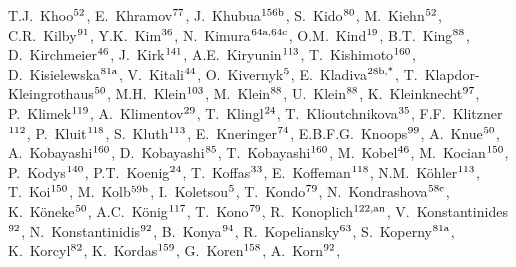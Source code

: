 \begin{flushleft}
T.J.~Khoo$^\textrm{\scriptsize 52}$,    
E.~Khramov$^\textrm{\scriptsize 77}$,    
J.~Khubua$^\textrm{\scriptsize 156b}$,    
S.~Kido$^\textrm{\scriptsize 80}$,    
M.~Kiehn$^\textrm{\scriptsize 52}$,    
C.R.~Kilby$^\textrm{\scriptsize 91}$,    
Y.K.~Kim$^\textrm{\scriptsize 36}$,    
N.~Kimura$^\textrm{\scriptsize 64a,64c}$,    
O.M.~Kind$^\textrm{\scriptsize 19}$,    
B.T.~King$^\textrm{\scriptsize 88}$,    
D.~Kirchmeier$^\textrm{\scriptsize 46}$,    
J.~Kirk$^\textrm{\scriptsize 141}$,    
A.E.~Kiryunin$^\textrm{\scriptsize 113}$,    
T.~Kishimoto$^\textrm{\scriptsize 160}$,    
D.~Kisielewska$^\textrm{\scriptsize 81a}$,    
V.~Kitali$^\textrm{\scriptsize 44}$,    
O.~Kivernyk$^\textrm{\scriptsize 5}$,    
E.~Kladiva$^\textrm{\scriptsize 28b,*}$,    
T.~Klapdor-Kleingrothaus$^\textrm{\scriptsize 50}$,    
M.H.~Klein$^\textrm{\scriptsize 103}$,    
M.~Klein$^\textrm{\scriptsize 88}$,    
U.~Klein$^\textrm{\scriptsize 88}$,    
K.~Kleinknecht$^\textrm{\scriptsize 97}$,    
P.~Klimek$^\textrm{\scriptsize 119}$,    
A.~Klimentov$^\textrm{\scriptsize 29}$,    
T.~Klingl$^\textrm{\scriptsize 24}$,    
T.~Klioutchnikova$^\textrm{\scriptsize 35}$,    
F.F.~Klitzner$^\textrm{\scriptsize 112}$,    
P.~Kluit$^\textrm{\scriptsize 118}$,    
S.~Kluth$^\textrm{\scriptsize 113}$,    
E.~Kneringer$^\textrm{\scriptsize 74}$,    
E.B.F.G.~Knoops$^\textrm{\scriptsize 99}$,    
A.~Knue$^\textrm{\scriptsize 50}$,    
A.~Kobayashi$^\textrm{\scriptsize 160}$,    
D.~Kobayashi$^\textrm{\scriptsize 85}$,    
T.~Kobayashi$^\textrm{\scriptsize 160}$,    
M.~Kobel$^\textrm{\scriptsize 46}$,    
M.~Kocian$^\textrm{\scriptsize 150}$,    
P.~Kodys$^\textrm{\scriptsize 140}$,    
P.T.~Koenig$^\textrm{\scriptsize 24}$,    
T.~Koffas$^\textrm{\scriptsize 33}$,    
E.~Koffeman$^\textrm{\scriptsize 118}$,    
N.M.~K\"ohler$^\textrm{\scriptsize 113}$,    
T.~Koi$^\textrm{\scriptsize 150}$,    
M.~Kolb$^\textrm{\scriptsize 59b}$,    
I.~Koletsou$^\textrm{\scriptsize 5}$,    
T.~Kondo$^\textrm{\scriptsize 79}$,    
N.~Kondrashova$^\textrm{\scriptsize 58c}$,    
K.~K\"oneke$^\textrm{\scriptsize 50}$,    
A.C.~K\"onig$^\textrm{\scriptsize 117}$,    
T.~Kono$^\textrm{\scriptsize 79}$,    
R.~Konoplich$^\textrm{\scriptsize 122,an}$,    
V.~Konstantinides$^\textrm{\scriptsize 92}$,    
N.~Konstantinidis$^\textrm{\scriptsize 92}$,    
B.~Konya$^\textrm{\scriptsize 94}$,    
R.~Kopeliansky$^\textrm{\scriptsize 63}$,    
S.~Koperny$^\textrm{\scriptsize 81a}$,    
K.~Korcyl$^\textrm{\scriptsize 82}$,    
K.~Kordas$^\textrm{\scriptsize 159}$,    
G.~Koren$^\textrm{\scriptsize 158}$,    
A.~Korn$^\textrm{\scriptsize 92}$,    

\end{flushleft}
